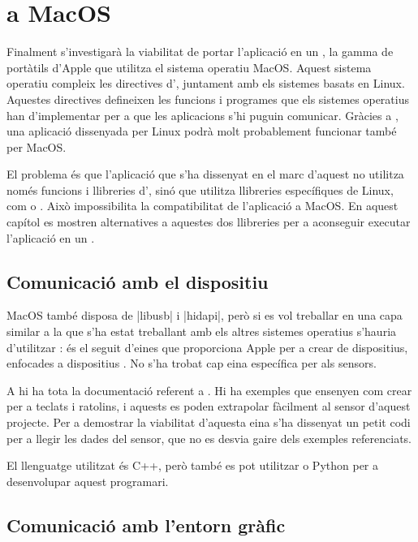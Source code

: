 \section{ a MacOS}

Finalment s'investigarà la viabilitat de portar l'aplicació en un ,
la gamma de portàtils d'Apple que utilitza el sistema operatiu MacOS. Aquest
sistema operatiu compleix les directives d', juntament amb els
sistemes basats en Linux. Aquestes directives defineixen les funcions i
programes que els sistemes operatius han d'implementar per a que les aplicacions
s'hi puguin comunicar. Gràcies a , una aplicació dissenyada per Linux
podrà molt probablement funcionar també per MacOS.

El problema és que l'aplicació que s'ha dissenyat en el marc d'aquest 
no utilitza només funcions i llibreries d', sinó que utilitza
llibreries específiques de Linux, com  o . Això
impossibilita la compatibilitat de l'aplicació a MacOS. En aquest capítol es
mostren alternatives a aquestes dos llibreries per a aconseguir executar
l'aplicació en un .

\subsection{Comunicació amb el dispositiu}

MacOS també disposa de \ord|libusb| i \ord|hidapi|, però si es vol treballar en
una capa similar a la que s'ha estat treballant amb els altres sistemes
operatius s'hauria d'utilitzar : és el seguit
d'eines que proporciona Apple per a crear  de dispositius,
enfocades a dispositius . No s'ha trobat cap eina específica per als
sensors.

A \cite{HidDriverKit} hi ha tota la documentació referent a .
Hi ha exemples que ensenyen com crear  per a teclats i ratolins,
i aquests es poden extrapolar fàcilment al sensor d'aquest projecte. Per a
demostrar la viabilitat d'aquesta eina s'ha dissenyat un petit codi per a
llegir les dades del sensor, que no es desvia gaire dels exemples referenciats.

El llenguatge utilitzat és C++, però també es pot utilitzar  o
Python per a desenvolupar aquest programari.

\subsection{Comunicació amb l'entorn gràfic}

